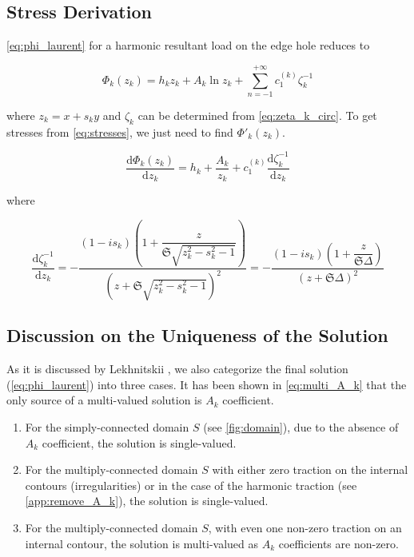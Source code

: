 \documentclass{article}
\begin{document}
\subsection{Stress Derivation}
\cref{eq:phi_laurent} for a harmonic resultant load on the edge hole reduces to 

\begin{equation}
    \Phi_k(z_k) = h_k z_k + A_k \ln{z_k} + \displaystyle\sum_{n=-1}^{+\infty} c_1^{(k)} \zeta_k^{-1}
    \label{eq:phi_laurent_reduced}
\end{equation}

where $z_k = x + s_k y$ and $\zeta_k$ can be determined from \cref{eq:zeta_k_circ}. To get stresses from \cref{eq:stresses}, we just need to find $\Phi'_k(z_k)$.

\begin{equation}
    \dfrac{\mathrm{d}\Phi_k(z_k)}{\mathrm{d}z_k} = h_k + \dfrac{A_k}{z_k} + c_1^{(k)} \dfrac{\mathrm{d}\zeta_k^{-1}}{\mathrm{d}z_k}
    \label{eq:d_phi_reduced}
\end{equation}

where

\begin{equation*}
    \dfrac{\mathrm{d}\zeta_k^{-1}}{\mathrm{d}z_k} = -\dfrac{(1 - i s_k)(1 + \dfrac{z}{\mathfrak{S}\sqrt{z_k^2 - s_k^2 - 1}})}{(z+\mathfrak{S}\sqrt{z_k^2 - s_k^2 - 1})^2} = -\dfrac{(1-i s_k)(1 + \dfrac{z}{\mathfrak{S}\Delta})}{(z + \mathfrak{S}\Delta)^2}
\end{equation*}

\subsection{Discussion on the Uniqueness of the Solution}
As it is discussed by Lekhnitskii \cite{Lekhnitskii1968}, we also categorize the final solution (\cref{eq:phi_laurent}) into three cases.  It has been shown in \cref{eq:multi_A_k} that the only source of a multi-valued solution is $A_k$ coefficient. 

\begin{enumerate}
    \item For the simply-connected domain $S$ (see \cref{fig:domain}), due to the absence of $A_k$ coefficient, the solution is single-valued. 
    \item For the multiply-connected domain $S$ with either zero traction on the internal contours (irregularities) or in the case of the harmonic traction (see \cref{app:remove_A_k}), the solution is single-valued.
    \item For the multiply-connected domain $S$, with even one non-zero traction on an internal contour, the solution is multi-valued as $A_k$ coefficients are non-zero.
\end{enumerate}
\end{document}
